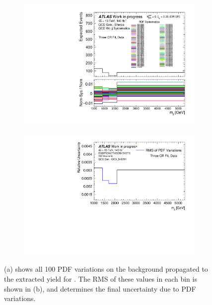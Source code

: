 \begin{figure}[t]
  \begin{subfigure}[b]{0.9\textwidth}
    \centering
    \includegraphics[width=\textwidth]{plots/diffx/pdf/data/mjj_QCD_Sh2211_BSSTRONGTHEORYSYSTS_3cr_PDF_0p01sigma_allvariations.pdf}
    \caption{}
  \end{subfigure}
  \hfill
  \begin{subfigure}[b]{0.9\textwidth}
    \centering
    \includegraphics[width=\textwidth]{plots/diffx/pdf/data/mjj_QCD_Sh2211_BSSTRONGTHEORYSYSTS_3cr_PDF_0p01sigma_RMS.pdf}
    \caption{}
  \end{subfigure}
  \caption{(a) shows all 100 PDF variations on the \qcdwy background propagated to the extracted \ewwy yield for \mjj. The RMS of these values in each bin is shown in (b), and determines the final uncertainty due to PDF variations.\label{fig:vbswy:allpdfsmjjqcd}}
\end{figure}

